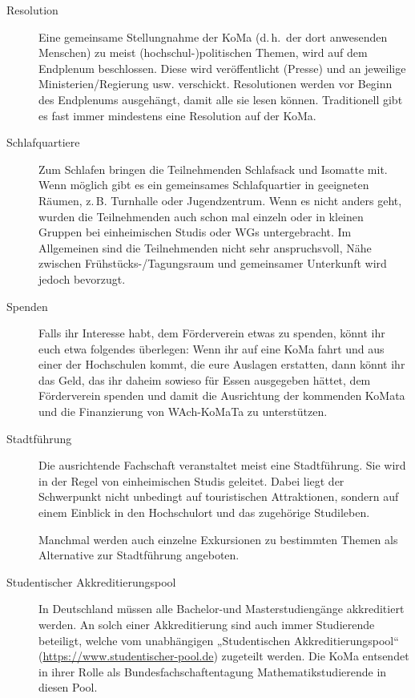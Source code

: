 \begin{description}
\item[Resolution]
    Eine gemeinsame Stellungnahme der KoMa (d.\,h.\ der dort anwesenden Menschen) zu meist (hochschul-)politischen Themen, wird auf dem Endplenum beschlossen.
    Diese wird veröffentlicht (Presse) und an jeweilige Ministerien/Regierung usw. verschickt.
    Resolutionen werden vor Beginn des Endplenums ausgehängt, damit alle sie lesen können. Traditionell gibt es fast immer mindestens eine Resolution auf der KoMa.

\item[Schlafquartiere]
    Zum Schlafen bringen die Teilnehmenden Schlafsack und Isomatte mit. Wenn möglich gibt es ein gemeinsames Schlafquartier in geeigneten Räumen, z.\,B. Turnhalle oder Jugendzentrum. Wenn es nicht anders geht, wurden die Teilnehmenden auch schon mal einzeln oder in kleinen Gruppen bei einheimischen Studis oder WGs untergebracht. 
    Im Allgemeinen sind die Teilnehmenden nicht sehr anspruchsvoll, Nähe zwischen Frühstücks-/Tagungsraum und gemeinsamer Unterkunft wird jedoch bevorzugt.

\item[Spenden]
    Falls ihr Interesse habt, dem Förderverein etwas zu spenden, könnt ihr euch etwa folgendes überlegen: Wenn ihr auf eine KoMa fahrt und aus einer der Hochschulen kommt, die eure Auslagen erstatten, dann könnt ihr das Geld, das ihr daheim sowieso für Essen ausgegeben hättet, dem Förderverein spenden und damit die Ausrichtung der kommenden KoMata und die Finanzierung von WAch-KoMaTa zu unterstützen.

\item[Stadtführung]
    Die ausrichtende Fachschaft veranstaltet meist eine Stadtführung. Sie wird in der Regel von einheimischen Studis geleitet. Dabei liegt der Schwerpunkt nicht unbedingt auf touristischen Attraktionen, sondern auf einem Einblick in den Hochschulort und das zugehörige Studileben.
    
    Manchmal werden auch einzelne Exkursionen zu bestimmten Themen als Alternative zur Stadtführung angeboten.

\item[Studentischer Akkreditierungspool]\label{itm:pool}
    In Deutschland müssen alle Bachelor-und Masterstudiengänge akkreditiert werden. An solch einer Akkreditierung sind auch immer Studierende beteiligt, welche vom unabhängigen „Studentischen Akkreditierungspool“ (\url{https://www.studentischer-pool.de}) zugeteilt werden. Die KoMa entsendet in ihrer Rolle als Bundesfachschaftentagung Mathematikstudierende in diesen Pool.


\end{description}
